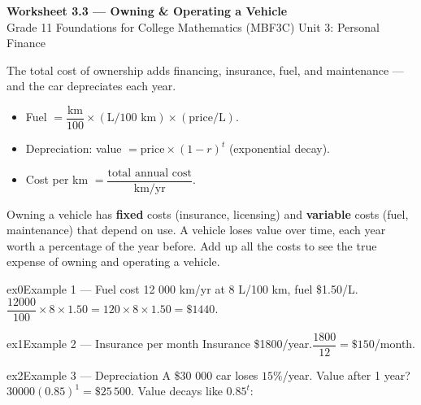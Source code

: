 \documentclass[11pt]{article}
\begin{document}
\begin{center}
{\LARGE\bfseries\color{titleblue}Worksheet 3.3 --- Owning \& Operating a Vehicle}\\[2pt]
{\small Grade 11 Foundations for College Mathematics (MBF3C) \textperiodcentered{} Unit 3: Personal Finance}
\end{center}

\begin{ideabox}
The total cost of ownership adds financing, insurance, fuel, and maintenance — and the car depreciates each year.
\begin{itemize}[leftmargin=*,itemsep=2pt]
  \item Fuel $=\dfrac{\text{km}}{100}\times(\text{L/100 km})\times(\text{price/L})$.
  \item Depreciation: value $=\text{price}\times(1-r)^{t}$ (exponential decay).
  \item Cost per km $=\dfrac{\text{total annual cost}}{\text{km/yr}}$.
\end{itemize}
\end{ideabox}

\begin{learnbox}
Owning a vehicle has \textbf{fixed} costs (insurance, licensing) and \textbf{variable} costs (fuel, maintenance) that depend on use.
A vehicle loses value over time, each year worth a percentage of the year before.
Add up all the costs to see the true expense of owning and operating a vehicle.
\end{learnbox}


\begin{example}{ex0}{Example 1 --- Fuel cost}
12 000 km/yr at 8 L/100 km, fuel \$1.50/L.\soln $\dfrac{12000}{100}\times8\times1.50=120\times8\times1.50=\$1440$.
\end{example}

\begin{example}{ex1}{Example 2 --- Insurance per month}
Insurance \$1800/year.\soln $\dfrac{1800}{12}=\$150$/month.
\end{example}

\begin{example}{ex2}{Example 3 --- Depreciation}
A \$30 000 car loses $15\%$/year. Value after 1 year?\soln $30000(0.85)^1=\$25\,500$. Value decays like $0.85^t$:
\end{example}
\end{document}
